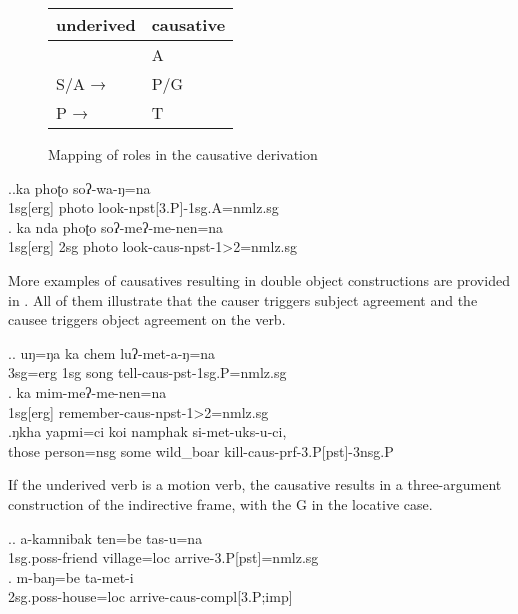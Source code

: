 \begin{figure}[htp]
\begin{center}
{\small
\begin{tabular}{l|l}
\hline	
{\sc underived}&{\sc causative} \\
\hline
& A\\
S/A →&P/G \\
P →& T\\

\hline	
\end{tabular}
}
\end{center}
\caption{Mapping of roles in the causative derivation}\label{fig-caus}
\end{figure}
 
 

 
\ex.\ag.ka phoʈo soʔ-wa-ŋ=na\\
{\sc 1sg[erg]} photo look{\sc -npst[3.P]-1sg.A=nmlz.sg}\\
\bg. ka nda phoʈo soʔ-meʔ-me-nen=na\\
{\sc 1sg[erg]} {\sc 2sg} photo look{\sc -caus-npst-1>2=nmlz.sg}\\
 
 
 
More examples of causatives resulting in double object constructions are provided in \Next. All of them illustrate  that the causer triggers subject agreement and the causee triggers object agreement on the verb. 

\ex.\ag. uŋ=ŋa ka chem luʔ-met-a-ŋ=na\\
{\sc 3sg=erg} {\sc 1sg} song tell{\sc -caus-pst-1sg.P=nmlz.sg}\\
\bg. ka mim-meʔ-me-nen=na\\
{\sc 1sg[erg]} remember{\sc -caus-npst-1>2=nmlz.sg} \\
\bg.ŋkha yapmi=ci    koi  namphak   si-met-uks-u-ci, \\
those person{\sc =nsg} some wild\_boar kill{\sc -caus-prf-3.P[pst]-3nsg.P}\\

If the underived verb is a motion verb, the causative results in a three-argument construction of the indirective frame, with the G in the locative case.

\ex.\ag. a-kamnibak ten=be tas-u=na\\
{\sc 1sg.poss-}friend  village{\sc =loc} arrive{\sc -3.P[pst]=nmlz.sg}\\
\bg. m-baŋ=be  ta-met-i\\
{\sc 2sg.poss-}house{\sc =loc} arrive{\sc -caus-compl[3.P;imp]}\\


